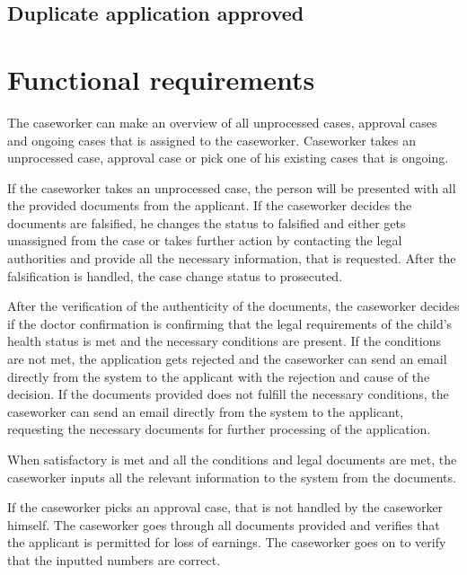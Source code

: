 \documentclass{article}
\begin{document}
\subsection*{Duplicate application approved}

\section{Functional requirements}


The caseworker can make an overview of all unprocessed cases, approval cases and ongoing cases that is assigned to the caseworker. Caseworker takes an unprocessed case, approval case or pick one of his existing cases that is ongoing.

If the caseworker takes an unprocessed case, the person will be presented with all the provided documents from the applicant. If the caseworker decides the documents are falsified, he changes the status to falsified and either gets unassigned from the case or takes further action by contacting the legal authorities and provide all the necessary information, that is requested. After the falsification is handled, the case change status to prosecuted.

After the verification of the authenticity of the documents, the caseworker decides if the doctor confirmation is confirming that the legal requirements of the child's health status is met and the necessary conditions are present. 
If the conditions are not met, the application gets rejected and the caseworker can send an email directly from the system to the applicant with the  rejection and cause of the decision. 
If the documents provided does not fulfill the necessary conditions, the caseworker can send an email directly from the system to the applicant, requesting the necessary documents for further processing of the application.

When satisfactory is met and all the conditions and legal documents are met, the caseworker inputs all the relevant information to the system from the documents.

If the caseworker picks an approval case, that is not handled by the caseworker himself. The caseworker goes through all documents provided and verifies that the applicant is permitted for loss of earnings. The caseworker goes on to verify that the inputted numbers are correct.
\end{document}
